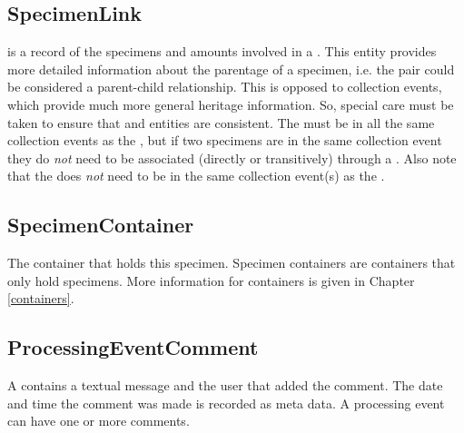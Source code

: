 \subsection*{SpecimenLink}
 is a record of the specimens and amounts involved
in a . This entity provides more detailed
information about the parentage of a specimen, i.e. the 
pair could be considered a parent-child relationship. This is opposed to
collection events, which provide much more general heritage information. So,
special care must be taken to ensure that 
and  entities are consistent. The 
must be in all the same collection events as the , but if two
specimens are in the same collection event they do \emph{not} need to be
associated (directly or transitively) through a . Also
note that the  does \emph{not} need to be in the same
collection event(s) as the .

\subsection*{SpecimenContainer}
The container that holds this specimen. Specimen containers are containers that
only hold specimens. More information for containers is given in Chapter
\ref{containers}.

\subsection*{ProcessingEventComment}
A  contains a textual message and the
user that added the comment. The date and time the comment was made is recorded
as meta data. A processing event can have one or more comments.

